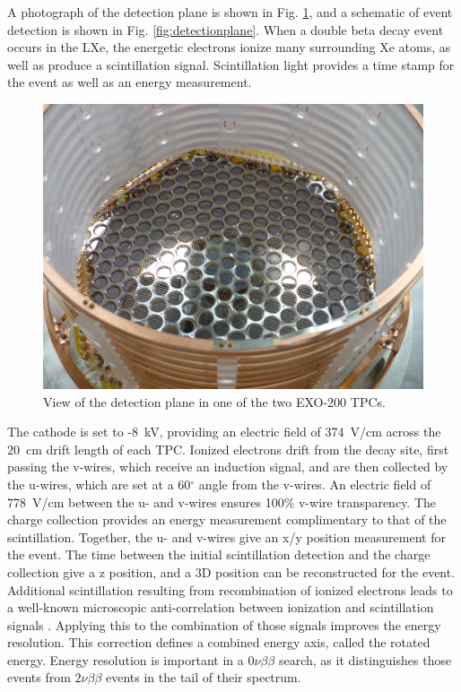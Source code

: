 A photograph of the detection plane is shown in Fig. \ref{fig:tpcphoto}, and a schematic of event detection is shown in Fig. \ref{fig:detectionplane}.  When a double beta decay event occurs in the LXe, the energetic electrons ionize many surrounding Xe atoms, as well as produce a scintillation signal.  Scintillation light provides a time stamp for the event as well as an energy measurement.

\begin{figure}[H]
	\centering
	\includegraphics[width=.9\textwidth]{figures/TPCphoto.jpeg}
	\caption{View of the detection plane in one of the two EXO-200 TPCs.}
\label{fig:tpcphoto}
\end{figure}

The cathode is set to -8~kV, providing an electric field of 374~V/cm across the 20~cm drift length of each TPC.  Ionized electrons drift from the decay site, first passing the v-wires, which receive an induction signal, and are then collected by the u-wires, which are set at a 60$^\circ$ angle from the v-wires.  An electric field of 778~V/cm between the u- and v-wires ensures 100\% v-wire transparency.  The charge collection provides an energy measurement complimentary to that of the scintillation.  Together, the u- and v-wires give an x/y position measurement for the event.  The time between the initial scintillation detection and the charge collection give a z position, and a 3D position can be reconstructed for the event.  \cite{EXO200TwoNuLong}  Additional scintillation resulting from recombination of ionized electrons leads to a well-known microscopic anti-correlation between ionization and scintillation signals \cite{anticorr}.  Applying this to the combination of those signals improves the energy resolution.  This correction defines a combined energy axis, called the rotated energy.  Energy resolution is important in a $0\nu\beta\beta$ search, as it distinguishes those events from $2\nu\beta\beta$ events in the tail of their spectrum.

